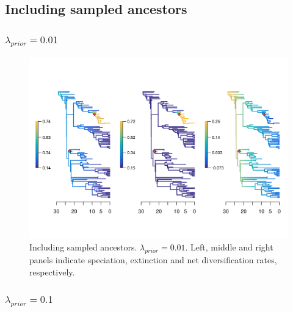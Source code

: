 \documentclass[a4paper, 12pt]{article}
\begin{document}
\subsection{Including sampled ancestors}

\subsubsection{$\lambda_{prior} = 0.01$}

\begin{figure}[H]
  \centering
  \includegraphics[width = \linewidth]{figures/diversification/sensitivity-analyses-with-sampled-ancestors/shifts-0-01/sensitivity-analysis-with-sampled-ancestors-0-01.png}
  \caption{Including sampled ancestors. $\lambda_{prior} = 0.01$. Left, middle and right panels indicate speciation, extinction and net diversification rates, respectively.}
  \label{fig-full-0-01}
\end{figure}

\subsubsection{$\lambda_{prior} = 0.1$}
\end{document}
